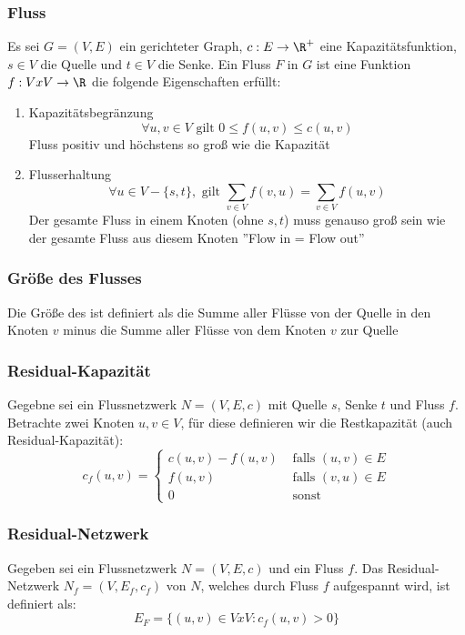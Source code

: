 	\subsubsection{Fluss}
		Es sei $G=(V,E)$ ein gerichteter Graph, $c:E\to \R^+$ eine Kapazitätsfunktion, $s\in V$ die Quelle und $t\in V$ die Senke. Ein Fluss $F$ in $G$ ist eine Funktion $f:VxV\to \R$ die folgende Eigenschaften erfüllt:
			\begin{enumerate}
			  \item Kapazitätsbegränzung 
			  	$$
			  		\forall u,v\in V \text{ gilt } 0\leq f(u,v)\leq c(u,v)
			  	$$
			  	Fluss positiv und höchstens so groß wie die Kapazität
			  	\item Flusserhaltung
			  	$$
			  		\forall u\in V-\{s,t\}, \text{ gilt } \displaystyle\sum_{v \in V}f(v,u)=\displaystyle\sum_{v\in V}f(u,v)
			  	$$
			  	Der gesamte Fluss in einem Knoten (ohne $s,t$) muss genauso groß sein wie der gesamte Fluss aus diesem Knoten ''Flow in = Flow out'' 
			\end{enumerate}
			\subsubsection{Größe des Flusses}
			Die Größe des ist definiert als die Summe aller Flüsse von der Quelle in den Knoten $v$ minus die Summe aller Flüsse von dem Knoten $v$ zur Quelle
			\subsubsection{Residual-Kapazität}
			Gegebne sei ein Flussnetzwerk $N=(V,E,c)$ mit Quelle $s$, Senke $t$ und Fluss $f$. Betrachte zwei Knoten $u,v\in V$, für diese definieren wir die Restkapazität (auch Residual-Kapazität): \newline
				$$
					c_f(u,v)=\begin{cases}
						c(u,v)-f(u,v) & \text{ falls } (u,v)\in E \\
						f(u,v) & \text{ falls } (v,u) \in E \\
						0 & \text{ sonst }
					\end{cases}
				$$
				\subsubsection{Residual-Netzwerk}
				Gegeben sei ein Flussnetzwerk $N=(V,E,c)$ und ein Fluss $f$. Das Residual-Netzwerk $N_f=(V,E_f,c_f)$ von $N$, welches durch Fluss $f$ aufgespannt wird, ist definiert als:
				$$
					E_F=\{(u,v)\in VxV:c_f(u,v)>0\}
				$$
